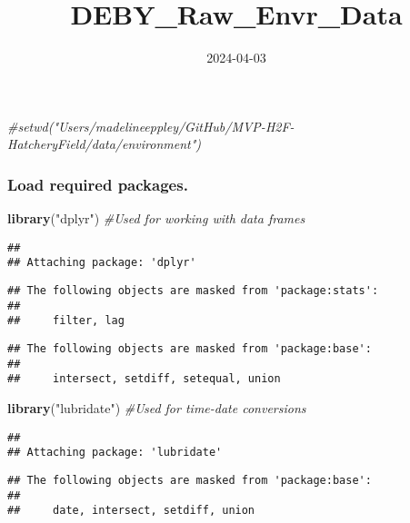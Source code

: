 \documentclass[
]{article}
\title{DEBY\_Raw\_Envr\_Data}
\author{}
\date{\vspace{-2.5em}2024-04-03}
\newenvironment{Shaded}{\begin{snugshade}}{\end{snugshade}}
\newcommand{\CommentTok}[1]{\textcolor[rgb]{0.56,0.35,0.01}{\textit{#1}}}
\newcommand{\FunctionTok}[1]{\textcolor[rgb]{0.13,0.29,0.53}{\textbf{#1}}}
\newcommand{\NormalTok}[1]{#1}
\newcommand{\StringTok}[1]{\textcolor[rgb]{0.31,0.60,0.02}{#1}}
\begin{document}
\maketitle

\begin{Shaded}
\begin{Highlighting}[]
\CommentTok{\#setwd("Users/madelineeppley/GitHub/MVP{-}H2F{-}HatcheryField/data/environment")}
\end{Highlighting}
\end{Shaded}

\hypertarget{load-required-packages.}{%
\subsubsection{Load required packages.}\label{load-required-packages.}}

\begin{Shaded}
\begin{Highlighting}[]
\FunctionTok{library}\NormalTok{(}\StringTok{"dplyr"}\NormalTok{) }\CommentTok{\#Used for working with data frames}
\end{Highlighting}
\end{Shaded}

\begin{verbatim}
## 
## Attaching package: 'dplyr'
\end{verbatim}

\begin{verbatim}
## The following objects are masked from 'package:stats':
## 
##     filter, lag
\end{verbatim}

\begin{verbatim}
## The following objects are masked from 'package:base':
## 
##     intersect, setdiff, setequal, union
\end{verbatim}

\begin{Shaded}
\begin{Highlighting}[]
\FunctionTok{library}\NormalTok{(}\StringTok{"lubridate"}\NormalTok{) }\CommentTok{\#Used for time{-}date conversions}
\end{Highlighting}
\end{Shaded}

\begin{verbatim}
## 
## Attaching package: 'lubridate'
\end{verbatim}

\begin{verbatim}
## The following objects are masked from 'package:base':
## 
##     date, intersect, setdiff, union
\end{verbatim}
\end{document}
